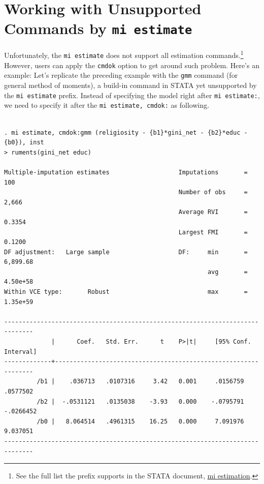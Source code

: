 \documentclass[11pt,]{article}
\theoremstyle{definition}
\theoremstyle{definition}
\theoremstyle{remark}
\begin{document}
\section{\texorpdfstring{Working with Unsupported Commands by
\texttt{mi\ estimate}}{Working with Unsupported Commands by mi estimate}}\label{working-with-unsupported-commands-by-mi-estimate}

Unfortunately, the \texttt{mi\ estimate} does not support all estimation
commands.\footnote{See the full list the prefix supports in the STATA
  document,
  \href{http://www.stata.com/manuals14/miestimation.pdf\#miestimationDescriptionestimation_command}{mi
  estimation}.} However, users can apply the \texttt{cmdok} option to
get around such problem. Here's an example: Let's replicate the
preceding example with the \texttt{gmm} command (for general method of
moments), a build-in command in STATA yet unsupported by the
\texttt{mi\ estimate} prefix. Instead of specifying the model right
after \texttt{mi\ estimate:}, we need to specify it after the
\texttt{mi\ estimate,\ cmdok:} as following.

\begin{verbatim}

. mi estimate, cmdok:gmm (religiosity - {b1}*gini_net - {b2}*educ - {b0}), inst
> ruments(gini_net educ)

Multiple-imputation estimates                   Imputations       =        100
                                                Number of obs     =      2,666
                                                Average RVI       =     0.3354
                                                Largest FMI       =     0.1200
DF adjustment:   Large sample                   DF:     min       =   6,899.68
                                                        avg       =   4.50e+58
Within VCE type:       Robust                           max       =   1.35e+59

------------------------------------------------------------------------------
             |      Coef.   Std. Err.      t    P>|t|     [95% Conf. Interval]
-------------+----------------------------------------------------------------
         /b1 |    .036713   .0107316     3.42   0.001     .0156759    .0577502
         /b2 |  -.0531121   .0135038    -3.93   0.000    -.0795791   -.0266452
         /b0 |   8.064514   .4961315    16.25   0.000     7.091976    9.037051
------------------------------------------------------------------------------
\end{verbatim}
\end{document}
